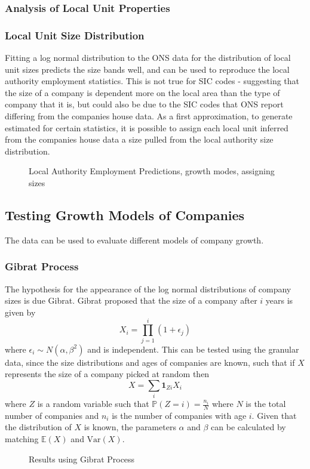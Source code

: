 \documentclass[a4paper,10pt]{article}
\begin{document}
\subsubsection{Analysis of Local Unit Properties}

\subsubsection{Local Unit Size Distribution}
Fitting a log normal distribution to the ONS data for the distribution of local unit sizes predicts the size bands well, and can be used to reproduce the local authority employment statistics. This is not true for SIC codes - suggesting that the size of a company is dependent more on the local area than the type of company that it is, but could also be due to the SIC codes that ONS report differing from the companies house data. As a first approximation, to generate estimated for certain statistics, it is possible to assign each local unit inferred from the companies house data a size pulled from the local authority size distribution. 
\begin{figure}[!ht]
 \caption{Local Authority Employment Predictions, growth modes, assigning sizes}
 \label{la_employment}
\end{figure}
\subsection{Testing Growth Models of Companies}
The data can be used to evaluate different models of company growth.
\subsubsection{Gibrat Process}
The hypothesis for the appearance of the log normal distributions of company sizes is due Gibrat. Gibrat proposed that the size of a company after $i$ years is given by
\begin{equation}
 X_i = \prod_{j=1}^{i}(1 + \epsilon_j)
\end{equation}
where $\epsilon_i \sim N(\alpha, \beta^2)$ and is independent. This can be tested using the granular data, since the size distributions and ages of companies are known, such that if $X$ represents the size of a company picked at random then
\begin{equation}
 X = \sum_{i}\mathbf{1}_{Zi}X_i
\end{equation}
where $Z$ is a random variable such that $\mathbb{P}(Z = i) = \frac{n_i}{N}$ where $N$ is the total number of companies and $n_i$ is the number of companies with age $i$. Given that the distribution of $X$ is known, the parameters $\alpha$ and $\beta$ can be calculated by matching $\mathbb{E}(X)$ and $\mathrm{Var}(X)$.
\begin{figure}[!ht]
 \caption{Results using Gibrat Process}
 \label{gibrat_local_units}
\end{figure}
\end{document}
